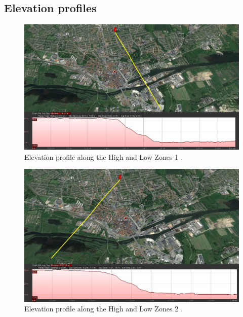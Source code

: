 
\begin{landscape}

\chapter{Elevation profiles}
\label{elevation_profile_of_randers}
\thispagestyle{empty}

\vspace{-6mm}

\begin{figure}[H]
\centering
\includegraphics[width=1.27\textwidth]{report/pictures/elev_profile}
\caption{Elevation profile along the High and Low Zones 1 \cite{map1}.}
\label{fig:elev_profile}
\end{figure}

\vfill
\raisebox{0pt}{\makebox[\linewidth]{\thepage}}


\newpage
\thispagestyle{empty}

\begin{figure}[H]
\centering
\includegraphics[width=1.27\textwidth]{report/pictures/elev_profile1}
\caption{Elevation profile along the High and Low Zones 2 \cite{map1}.}
\label{fig:elev_profile1}
\end{figure}
\thispagestyle{empty}

\vfill
\raisebox{0pt}{\makebox[\linewidth]{\thepage}}

\end{landscape}